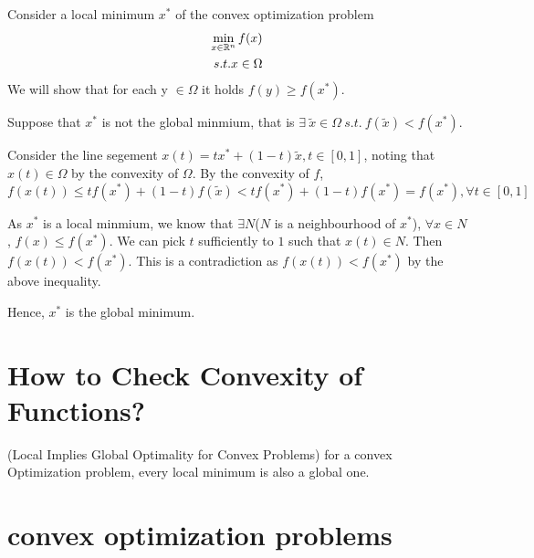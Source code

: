 \documentclass[12pt,oneside]{book} %
\begin{document}
\begin{spacing}{1}
\begin{proofsolution}
    \textcolor{LightRed}{
        Consider a local minimum $x^*$ of the convex optimization problem
        \begin{equation}
            \begin{split}
                \min_{x\in \mathbb{R}^n} f(x)\\
                s.t. x\in \Omega \nonumber
            \end{split}
        \end{equation}
        We will show that for each y $\in \Omega$ it holds $f(y)\geq f(x^*)$. 
    }

    Suppose that $x^*$ is not the global minmium, that is $\exists \ \widetilde{x} \in \Omega \ s.t. \ f(\widetilde{x})<f(x^*)$. \par
    Consider the line segement $x(t)=tx^*+(1-t)\widetilde{x}, t\in [0,1]$, 
        noting that $x(t)\in \Omega$ by the convexity of $\Omega$. 
        By the convexity of $f$,
        \begin{equation*}
            f(x(t))\leq tf(x^*)+(1-t)f(\widetilde{x})<tf(x^*)+(1-t)f(x^*)=f(x^*),\forall t\in [0,1]
        \end{equation*}
    \par
    As $x^*$ is a local minmium, we know that $\exists N$($N$ is a neighbourhood of $x^*$), $\forall x\in N$, $f(x)\leq f(x^*)$. 
        We can pick $t$ sufficiently to $1$ such that $x(t) \in N$. Then $f(x(t)) < f(x^*)$. 
        This is a contradiction as $f(x(t))<f(x^*)$ by the above inequality.
    \par
    Hence, $x^*$ is the global minimum. 
\end{proofsolution}



\section{How to Check Convexity of Functions?}

\begin{theorem}{
    (Local Implies Global Optimality for Convex Problems)
}{}
    {
        for a convex Optimization problem, every local minimum is also a global one. 
    }
\end{theorem}


\section{convex optimization problems}



\end{spacing}
\end{document}
